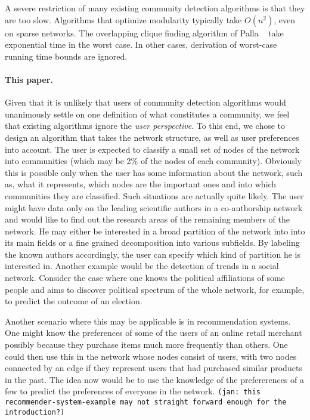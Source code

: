 A severe restriction of many existing community detection algorithms 
is that they are too slow. Algorithms that optimize modularity typically 
take $O(n^2)$, even on sparse networks. The overlapping clique finding 
algorithm of Palla \etal~\cite{PDFV05} take exponential time in the worst case.
In other cases, derivation of worst-case running time bounds are ignored. 

\paragraph{This paper.}
Given that it is unlikely that users of community detection algorithms 
would unanimously settle on one definition of what constitutes a community, 
we feel that existing algorithms ignore the \emph{user perspective}.
To this end, we chose to design an algorithm that takes the network structure, 
as well as user preferences into account. 
The user is expected to classify a small set of nodes of the network 
into communities (which may be 2\% of the nodes of each community).
Obviously this is possible only when the user has some 
information about the network, such as, what it represents, which nodes 
are the important ones and into which communities they are classified. 
Such situations are actually quite likely. The user might have data only 
on the leading scientific authors in a co-authorship network 
and would like to find out the research areas of the remaining members of the network. 
He may either be interested in a broad partition of the network into into its main fields
or a fine grained decomposition into various subfields.
By labeling the known authors accordingly,
the user can specify which kind of partition he is interested in.
Another example would be the detection of trends in a social network.
Consider the case where one knows the political affiliations of some people 
and aims to discover political spectrum of the whole network, 
for example, to predict the outcome of an election. 


Another scenario where this may be applicable is in recommendation systems. 
One might know the preferences of some of the users of an online retail 
merchant possibly because they purchase items much more frequently than others. 
One could then use this in the network whose nodes consist of users, with two 
nodes connected by an edge if they represent users that had purchased similar products in the past. 
The idea now would be to use the knowledge of the prefererences of a few to 
predict the preferences of everyone in the network. 
\texttt{(jan: this recommender-system-example may not straight forward enough for the introduction?)}


